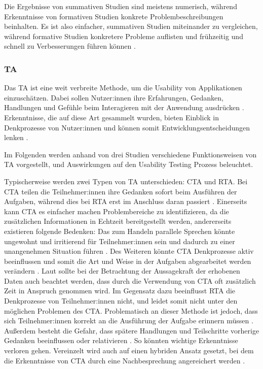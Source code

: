 Die Ergebnisse von summativen Studien sind meistens numerisch, während Erkenntnisse von formativen Studien konkrete Problembeschreibungen beinhalten. Es ist also einfacher, summativen Studien miteinander zu vergleichen, während formative Studien konkretere Probleme auflisten und frühzeitig und schnell zu Verbesserungen führen können \parencite{barnumUsabilityTesting2021}.

\subsubsection{\acl{TA}}
\label{sec:think-aloud}

Das \acf{TA} ist eine weit verbreite Methode, um die Usability von Applikationen einzuschätzen. Dabei sollen Nutzer:innen ihre Erfahrungen, Gedanken, Handlungen und Gefühle beim Interagieren mit der Anwendung ausdrücken \parencite{barnumUsabilityTesting2021}. Erkenntnisse, die auf diese Art gesammelt wurden, bieten Einblick in Denkprozesse von Nutzer:innen und können somit Entwicklungsentscheidungen lenken \parencite{alhadretiRethinkingThinking2018}.

Im Folgenden werden anhand von drei Studien verschiedene Funktionsweisen von \ac{TA} vorgestellt, und Auswirkungen auf den Usability Testing Prozess beleuchtet.

\pskip
Typischerweise werden zwei Typen von \ac{TA} unterschieden: \ac{CTA} und \ac{RTA}. Bei \ac{CTA} teilen die Teilnehmer:innen ihre Gedanken sofort beim Ausführen der Aufgaben, während dies bei \ac{RTA} erst im Anschluss daran passiert \parencite{alhadretiRethinkingThinking2018}. Einerseits kann \ac{CTA} es einfacher machen Problembereiche zu identifizieren, da die zusätzlichen Informationen in Echtzeit bereitgestellt werden, andererseits existieren folgende Bedenken: Das zum Handeln parallele Sprechen könnte ungewohnt und irritierend für Teilnehmer:innen sein und dadurch zu einer unangenehmen Situation führen \parencite{alhadretiRethinkingThinking2018}. Des Weiteren könnte \ac{CTA} Denkprozesse aktiv beeinflussen und somit die Art und Weise in der Aufgaben abgearbeitet werden verändern \parencite{alhadretiRethinkingThinking2018}. Laut \citeauthor{alhadretiRethinkingThinking2018} sollte bei der Betrachtung der Aussagekraft der erhobenen Daten auch beachtet werden, dass durch die Verwendung von \ac{CTA} oft zusätzlich Zeit in Anspruch genommen wird. Im Gegensatz dazu beeinflusst \ac{RTA} die Denkprozesse von Teilnehmer:innen nicht, und leidet somit nicht unter den möglichen Problemen des \ac{CTA}. Problematisch an dieser Methode ist jedoch, dass sich Teilnehmer:innen korrekt an die Ausführung der Aufgabe erinnern müssen \parencite{alhadretiRethinkingThinking2018}. Außerdem besteht die Gefahr, dass spätere Handlungen und Teilschritte vorherige Gedanken beeinflussen oder relativieren \parencite{alhadretiRethinkingThinking2018}. So könnten wichtige Erkenntnisse verloren gehen. Vereinzelt wird auch auf einen hybriden Ansatz gesetzt, bei dem die Erkenntnisse von \ac{CTA} durch eine Nachbesprechung
angereichert werden \parencite{alhadretiRethinkingThinking2018}.

